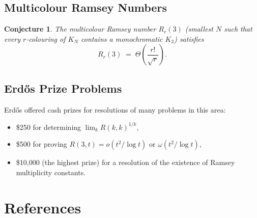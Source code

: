 \documentclass[12pt,a4paper]{amsart}
\newtheorem{conjecture}[theorem]{Conjecture}
\theoremstyle{definition}
\theoremstyle{remark}
\begin{document}
\subsection{Multicolour Ramsey Numbers}

\begin{conjecture}
The multicolour Ramsey number $R_r(3)$ (smallest $N$ such that every $r$-colouring
of $K_N$ contains a monochromatic $K_3$) satisfies
\[
  R_r(3) \;=\; \Theta\!\left(\frac{r!}{\sqrt{r}}\right).
\]
\end{conjecture}

\subsection{Erd\H{o}s Prize Problems}

Erd\H{o}s offered cash prizes for resolutions of many problems in this area:
\begin{itemize}[noitemsep]
  \item \$250 for determining $\lim_{k} R(k,k)^{1/k}$,
  \item \$500 for proving $R(3,t) = o(t^2/\log t)$ or $\omega(t^2/\log t)$,
  \item \$10{,}000 (the highest prize) for a resolution of the existence of Ramsey multiplicity constants.
\end{itemize}

\section*{References}
\end{document}
